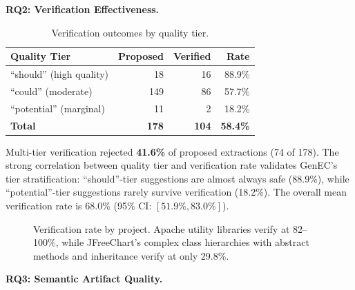 \documentclass[sigconf]{acmart}
\begin{document}
\textbf{RQ2: Verification Effectiveness.}

\begin{table}[t]
\centering\small
\caption{Verification outcomes by quality tier.}
\label{tab:rq2}
\begin{tabular}{@{}lrrr@{}}
\toprule
\textbf{Quality Tier} & \textbf{Proposed} & \textbf{Verified} & \textbf{Rate} \\
\midrule
``should'' (high quality) & 18  & 16 & 88.9\% \\
``could'' (moderate)      & 149 & 86 & 57.7\% \\
``potential'' (marginal)  & 11  &  2 & 18.2\% \\
\midrule
\textbf{Total}            & \textbf{178} & \textbf{104} & \textbf{58.4\%} \\
\bottomrule
\end{tabular}
\end{table}

Multi-tier verification rejected \textbf{41.6\%} of proposed extractions (74 of
178). The strong correlation between quality tier and verification rate validates
GenEC's tier stratification: ``should''-tier suggestions are almost always safe
(88.9\%), while ``potential''-tier suggestions rarely survive verification
(18.2\%). The overall mean verification rate is 68.0\% (95\% CI:
$[51.9\%, 83.0\%]$).

\begin{figure}[t]
\centering
{}
\caption{Verification rate by project. Apache utility libraries verify at
82--100\%, while JFreeChart's complex class hierarchies with abstract methods
and inheritance verify at only 29.8\%.}
\label{fig:project-verification}
\end{figure}

\textbf{RQ3: Semantic Artifact Quality.}
\end{document}

